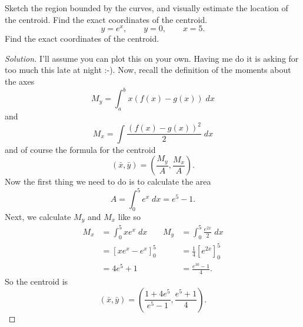 \begin{problem}
Sketch the region bounded by the curves, and visually estimate the location
of the centroid. Find the exact coordinates of the centroid.
\[
y=e^x,\qquad
y=0,\qquad
x=5.
\]
Find the exact coordinates of the centroid.
\end{problem}
\begin{proof}[Solution]
I'll assume you can plot this on your own. Having me do it is asking for
too much this late at night :-). Now, recall the definition of the moments
about the axes
\begin{equation}
\label{eq:moment-about-x-continuous}
M_y=\int_a^b x(f(x)-g(x))\;dx
\end{equation}
and
\begin{equation}
\label{eq:moment-about-y-continuous}
M_x=\int \frac{(f(x)-g(x))^2}{2}\;dx
\end{equation}
and of course the formula for the centroid
\begin{equation}
  \label{eq:center-of-mass}
(\bar x,\bar y)=\left(\frac{M_y}{A},\frac{M_x}{A}\right).
\end{equation}
Now the first thing we need to do is to calculate the area
\[
A=\int_0^5 e^x\;dx=e^5-1.
\]
Next, we calculate $M_y$ and $M_x$ like so
\begin{align*}
M_x&=\int_0^5 xe^x\;dx&M_y&=\int_0^5\frac{e^{2x}}{2}\;dx\\
&=\left[xe^x-e^x\right]_0^5&&=\frac{1}{4}\left[e^{2x}\right]_0^5\\
&=4e^5+1&&=\frac{e^{10}-1}{4}.
\end{align*}
So the centroid is
\[
\boxed{
(\bar x,\bar y)
=\left(\frac{1+4e^5}{e^5-1},\frac{e^5+1}{4}\right)
.
}
\]
\end{proof}

